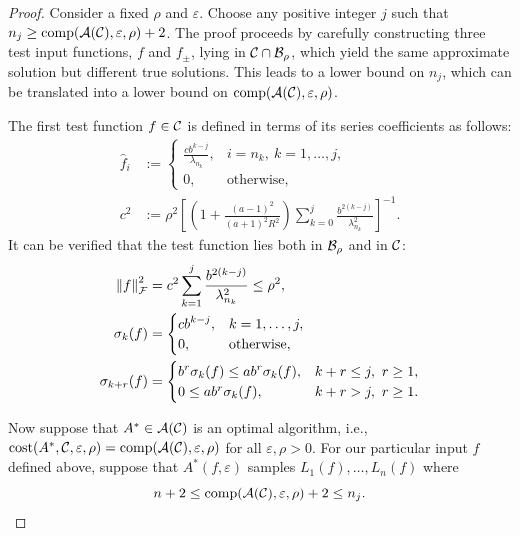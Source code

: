 \documentclass[graybox,footinfo]{svmult}
\newcommand{\DHJRnorm}[2][{}]{\ensuremath{\left \lVert #2 \right \rVert}_{#1}}
\begin{document}
\begin{proof}
Consider a fixed $\rho$ and $\varepsilon$.  Choose any positive integer $j$ such that $n_j \ge \textup{comp}({\mathcal{A}}({\mathcal{C}}),\varepsilon,\rho) + 2$.  The proof proceeds by carefully constructing three test input functions, $f$ and $f_{\pm}$, lying in ${\mathcal{C}} \cap {\mathcal{B}}_{\rho}$, which yield the same approximate solution but different true solutions.  This leads to a lower bound on $n_j$, which can be translated into a lower bound on $\textup{comp}({\mathcal{A}}({\mathcal{C}}),\varepsilon,\rho)$. 

The first test function $f \in {\mathcal{C}}$ is defined in terms of its series coefficients as follows:
\begin{align}
\nonumber
\widehat{f}_i &:= \begin{cases}
\displaystyle
\frac{c b^{k-j}}{\lambda_{n_{k}}},  & i =  n_{k}, \ k = 1, \ldots, j,
\\
0, & \text{otherwise},
\end{cases}
\\
\nonumber
c^2 &:=  \rho^2 \left[ \left(1+\frac{(a-1)^2}{(a+1)^{2} R^2 }\right)\sum_{k=0}^j \frac{b^{2(k-j)}}{\lambda_{n_{k}}^2}\right]^{-1}.
\end{align}
It can be verified that the test function lies both in ${\mathcal{B}}_{\rho}$ and in ${\mathcal{C}}$:
\begin{align}
\nonumber
\DHJRnorm[\calF]{f}^2 &=  c^2\sum_{k=1}^j \frac{ b^{2(k-j)}}{\lambda^2_{n_{k}}} \le \rho^2,
\\
\nonumber
\sigma_k(f) &= \begin{cases}
\displaystyle
c b^{k-j}, & k =1, \ldots, j, \\
0, & \text{otherwise},
\end{cases}
\\
\nonumber
\sigma_{k+r}(f) &= \begin{cases}
\displaystyle 
b^{r} \sigma_k(f) \le a b^r \sigma_k(f), & k+r \le j, \ r \ge 1,
\\
0 \le a b^r \sigma_k(f), & k+r > j, \ r \ge 1.
\end{cases}
\end{align}

Now suppose that $A^* \in {\mathcal{A}}({\mathcal{C}})$ is an optimal algorithm, i.e., $\textup{cost}(A^*,{\mathcal{C}},\varepsilon,\rho) =  \textup{comp}({\mathcal{A}}({\mathcal{C}}),\varepsilon,\rho)$ for all $\varepsilon, \rho > 0$.  For our particular input $f$ defined above, suppose that $A^*(f,\varepsilon)$ samples $L_1(f), \ldots, L_n(f)$ where 
\[
n + 2\le \textup{comp}({\mathcal{A}}({\mathcal{C}}),\varepsilon,\rho) + 2 \le n_j.
\]  


\end{proof}
\end{document}
